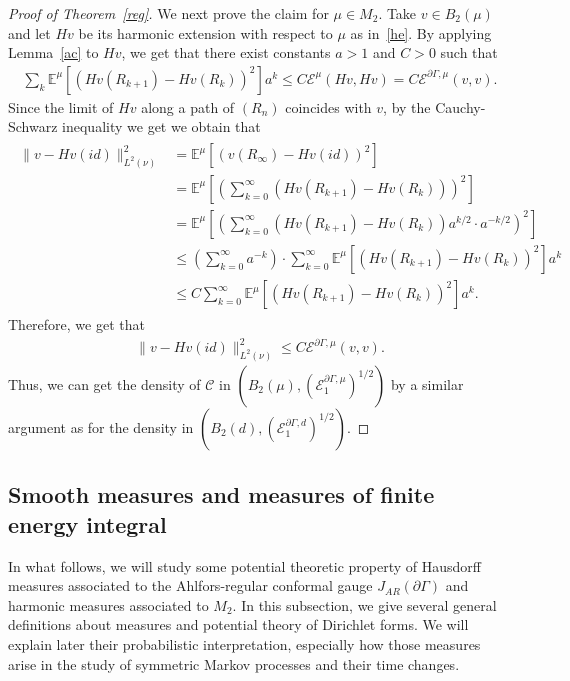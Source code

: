 \documentclass[AHL,Unicode,longabstracts,published]{cedram}
\newcommand{\ce}{\mathcal{E}}
\newcommand{\cC}{\mathcal{C}}
\newcommand{\be}{\mathbb{E}}
\begin{document}
\begin{proof}[{Proof of Theorem~\ref{reg}}]
We next prove the claim for $\mu\in M_2$. Take $v\in B_2(\mu)$ and let $Hv$ be its harmonic extension with respect to $\mu$ as in~\eqref{he}. By applying Lemma~\ref{ac} to $Hv$, we get that there exist constants $a>1$ and $C>0$ such that
\begin{align*}
\sum_k\be^{\mu}\left[\left(Hv(R_{k+1})-Hv(R_k)\right)^2\right]a^k\leq C\ce^\mu(Hv,Hv)=C \ce^{\partial\Gamma,\mu}(v,v).
\end{align*}
Since the limit of $Hv$ along a path of $(R_n)$ coincides with $v$, by the Cauchy-Schwarz inequality we get we obtain that
\begin{align}\label{cs-ineq}
\begin{split}
\|v-Hv(id)\|_{L^2(\nu)}^2 &=\be^{\mu}\left[\left(v(R_{\infty})-Hv(id)\right)^2\right]
\\
&=\be^{\mu}\left[\left(\sum_{k=0}^{\infty}\left(Hv(R_{k+1})-Hv(R_k)\right)\right)^2\right]\\
&=\be^{\mu}\left[\left(\sum_{k=0}^{\infty}\left(Hv(R_{k+1})-Hv(R_k)\right)a^{k/2}\cdot a^{-k/2}\right)^2\right]
\\
&\leq \left(\sum_{k=0}^{\infty}a^{-k}\right)\cdot\sum_{k=0}^{\infty}\be^{\mu}\left[\left(Hv(R_{k+1})-Hv(R_k)\right)^2\right]a^k
\\
&\leq C \sum_{k=0}^{\infty}\be^{\mu}\left[\left(Hv(R_{k+1})-Hv(R_k)\right)^2\right]a^k.
\end{split}
\end{align}
Therefore, we get that
\begin{align}\label{nu}
\|v-Hv(id)\|_{L^2(\nu)}^2\leq C\ce^{\partial\Gamma,\mu}(v,v).
\end{align}
Thus, we can get the density of $\cC$ in $(B_{2}(\mu),(\ce^{\partial\Gamma,\mu}_1)^{1/2})$ by a similar argument as for the density in $(B_2(d), (\ce^{\partial\Gamma,d}_1)^{1/2})$.
\end{proof}

\subsection{Smooth measures and measures of finite energy integral}
In what follows, we will study some potential theoretic property of Hausdorff measures associated to the Ahlfors-regular conformal gauge $J_{AR}(\partial\Gamma)$ and harmonic measures associated to $M_2$. In this subsection, we give several general definitions about measures and potential theory of Dirichlet forms. We will explain later their probabilistic interpretation, especially how those measures arise in the study of symmetric Markov processes and their time changes.
\end{document}
